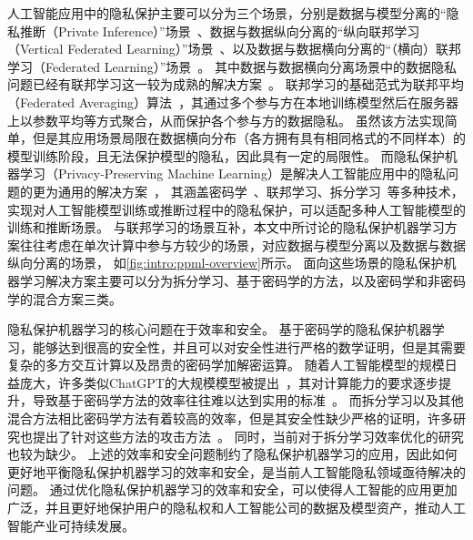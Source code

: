 人工智能应用中的隐私保护主要可以分为三个场景，分别是数据与模型分离的“隐私推断（Private Inference）”场景~\cite{mann_2023_secure_inference}、数据与数据纵向分离的“纵向联邦学习（Vertical Federated Learning）”场景~\cite{liu2024vertical}、以及数据与数据横向分离的“（横向）联邦学习（Federated Learning）”场景~\cite{yangqiang2019federated}。
%
%
其中数据与数据横向分离场景中的数据隐私问题已经有联邦学习这一较为成熟的解决方案~\cite{yangqiang2019federated}。
联邦学习的基础范式为联邦平均（Federated Averaging）算法~\cite{mcmahan_2017_fedavg}，其通过多个参与方在本地训练模型然后在服务器上以参数平均等方式聚合，从而保护各个参与方的数据隐私。
%
虽然该方法实现简单，但是其应用场景局限在数据横向分布（各方拥有具有相同格式的不同样本）的模型训练阶段，且无法保护模型的隐私，因此具有一定的局限性。
%
而隐私保护机器学习（Privacy-Preserving Machine Learning）是解决人工智能应用中的隐私问题的更为通用的解决方案~\cite{al_2019_ppml,xu_2021_ppml}，
其涵盖密码学~\cite{evans_2018_pragmatic_mpc}、联邦学习、拆分学习~\cite{vepakomma2018split}等多种技术，实现对人工智能模型训练或推断过程中的隐私保护，可以适配多种人工智能模型的训练和推断场景。
%
与联邦学习的场景互补，本文中所讨论的隐私保护机器学习方案往往考虑在单次计算中参与方较少的场景，对应数据与模型分离以及数据与数据纵向分离的场景，
如\autoref{fig:intro:ppml-overview}所示。
%
面向这些场景的隐私保护机器学习解决方案主要可以分为拆分学习、基于密码学的方法，以及密码学和非密码学的混合方案三类。
%

隐私保护机器学习的核心问题在于效率和安全。
%
基于密码学的隐私保护机器学习，能够达到很高的安全性，并且可以对安全性进行严格的数学证明，但是其需要复杂的多方交互计算以及昂贵的密码学加解密运算。
随着人工智能模型的规模日益庞大，许多类似ChatGPT的大规模模型被提出~\cite{chatgpt,touvron_2023_llama,duzhengxiao_2022_glm}，其对计算能力的要求逐步提升，导致基于密码学方法的效率往往难以达到实用的标准~\cite{hou2023ciphergpt}。
%
而拆分学习以及其他混合方法相比密码学方法有着较高的效率，但是其安全性缺少严格的证明，许多研究也提出了针对这些方法的攻击方法~\cite{hezecheng_2019_model_inversion_attack,abuadbba2020can_split,wong_2020_lwe_model}。
同时，当前对于拆分学习效率优化的研究也较为缺少。
%
上述的效率和安全问题制约了隐私保护机器学习的应用，因此如何更好地平衡隐私保护机器学习的效率和安全，是当前人工智能隐私领域亟待解决的问题。
%
通过优化隐私保护机器学习的效率和安全，可以使得人工智能的应用更加广泛，并且更好地保护用户的隐私权和人工智能公司的数据及模型资产，推动人工智能产业可持续发展。


